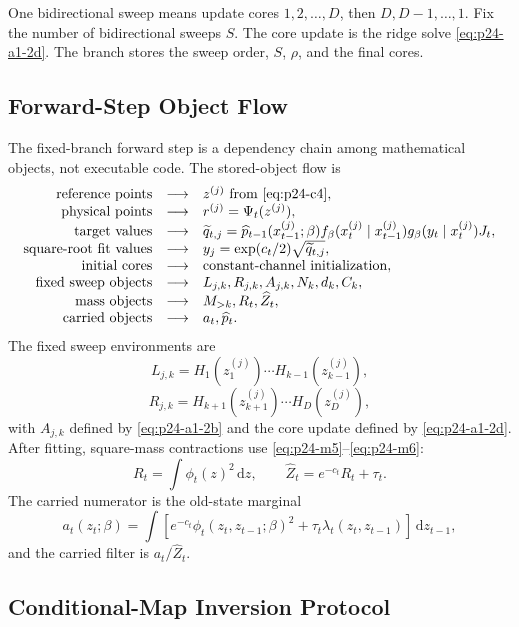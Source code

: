 \documentclass[11pt]{article}
\newcommand{\dd}{\,\mathrm d}
\begin{document}
One bidirectional sweep means update cores \(1,2,\ldots,D\), then
\(D,D-1,\ldots,1\).  Fix the number of bidirectional sweeps \(S\).  The core
update is the ridge solve \eqref{eq:p24-a1-2d}.  The branch stores the sweep order, \(S\),
\(\rho\), and the final cores.

\subsection{Forward-Step Object Flow}

The fixed-branch forward step is a dependency chain among mathematical
objects, not executable code.  The stored-object flow is
\[
\begin{array}{rcl}
\text{reference points} &\longrightarrow& z^{(j)} \text{ from \eqref{eq:p24-c4}},\\
\text{physical points} &\longrightarrow& r^{(j)}=\Psi_t(z^{(j)}),\\
\text{target values} &\longrightarrow&
    \widetilde q_{t,j}
    =
    \widehat p_{t-1}(x_{t-1}^{(j)};\beta)
    f_\beta(x_t^{(j)}\mid x_{t-1}^{(j)})
    g_\beta(y_t\mid x_t^{(j)})J_t,\\
\text{square-root fit values} &\longrightarrow&
    y_j=\exp(c_t/2)\sqrt{\widetilde q_{t,j}},\\
\text{initial cores} &\longrightarrow&
    \text{constant-channel initialization},\\
\text{fixed sweep objects} &\longrightarrow&
    L_{j,k},R_{j,k},A_{j,k},N_k,d_k,C_k,\\
\text{mass objects} &\longrightarrow&
    M_{>k},R_t,\widehat Z_t,\\
\text{carried objects} &\longrightarrow&
    a_t,\widehat p_t.
\end{array}
\label{eq:p24-c12}
\]
The fixed sweep environments are
\[
    L_{j,k}=H_1(z_1^{(j)})\cdots H_{k-1}(z_{k-1}^{(j)}),
\]
\[
    R_{j,k}=H_{k+1}(z_{k+1}^{(j)})\cdots H_D(z_D^{(j)}),
\]
with \(A_{j,k}\) defined by \eqref{eq:p24-a1-2b} and the core update defined by \eqref{eq:p24-a1-2d}.
After fitting, square-mass contractions use \eqref{eq:p24-m5}--\eqref{eq:p24-m6}:
\[
    R_t=\int\phi_t(z)^2\dd z,\qquad
    \widehat Z_t=e^{-c_t}R_t+\tau_t.
\]
The carried numerator is the old-state marginal
\[
    a_t(z_t;\beta)
    =
    \int
    \left[e^{-c_t}\phi_t(z_t,z_{t-1};\beta)^2
    +\tau_t\lambda_t(z_t,z_{t-1})\right]\dd z_{t-1},
\]
and the carried filter is \(a_t/\widehat Z_t\).

\subsection{Conditional-Map Inversion Protocol}
\end{document}
